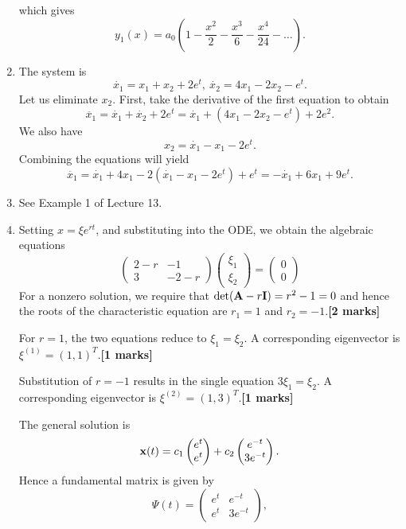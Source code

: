 \documentclass[11pt,a4paper]{article}
\newcommand{\mrk}[1]{\hfill\textbf{[#1 marks]}}
\begin{document}
\begin{enumerate}
$$		$$
		which gives
		$$
		y_1(x) = a_0\left(1 - \frac{x^2}{2} - \frac{x^3}{6} - \frac{x^4}{24}-\ldots\right).
		$$
		\item The system is
		$$
		\dot{x_1} = x_1 + x_2 + 2e^t,\ \dot{x_2} = 4x_1 - 2x_2 - e^t.
		$$
		Let us eliminate $x_2$. First, take the derivative of the first equation to obtain
		$$
		\ddot{x_1} = \dot{x_1} + \dot{x_2} +2e^t = \dot{x_1} + (4x_1 - 2x_2 - e^t) + 2e^2.
		$$
		We also have
		$$
		x_2 = \dot{x_1} - x_1 - 2e^t.
		$$
		Combining the equations will yield
		$$
		\ddot{x_1} = \dot{x_1} + 4x_1 - 2(\dot{x_1} - x_1 - 2e^t) + e^t = -\dot{x_1} + 6x_1 +9e^t.
		$$
		\item See Example 1 of Lecture 13.
		\item Setting $x = \xi e^{rt}$, and substituting into the ODE, we obtain the algebraic equations
		$$
		\begin{pmatrix}
			2-r & -1\\
			3 & -2-r
		\end{pmatrix}
		\begin{pmatrix}
			\xi_1\\
			\xi_2
		\end{pmatrix}
		=
		\begin{pmatrix}
			0\\
			0
		\end{pmatrix}
		$$
		For a nonzero solution, we require that $\det(\vb{A} - r\vb{I}) = r^2 - 1 = 0$ and hence the roots of the characteristic equation are $r_1 = 1$ and $r_2 = -1$.\mrk{2}\par
		For $r = 1$, the two equations reduce to $\xi_1 = \xi_2$. A corresponding eigenvector is $\xi^{(1)} = (1, 1)^T$.\mrk{1}\par
		Substitution of $r = -1$ results in the single equation $3\xi_1 = \xi_2$. A corresponding eigenvector is $\xi^{(2)} = (1, 3)^T$.\mrk{1}\par
		The general solution is
		$$
		\vb{x}(t) = c_1
		\begin{pmatrix}
			e^t\\
			e^t
		\end{pmatrix} + c_2
		\begin{pmatrix}
			e^{-t}\\
			3e^{-t}
		\end{pmatrix}.
		$$ 
		Hence a fundamental matrix is given by
		$$
		\Psi (t) =
		\begin{pmatrix}
			e^t & e^{-t}\\
			e^t & 3e^{-t}
		\end{pmatrix},
		$$

\end{enumerate}
\end{document}

